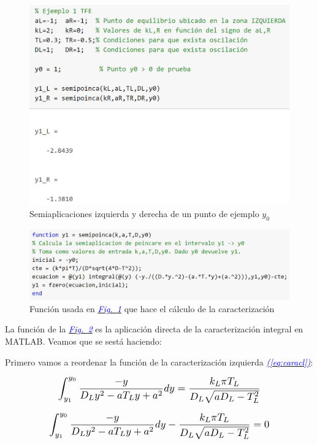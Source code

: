 \documentclass[12pt,a4paper]{report} %
\newcommand{\fref}[1]{\hyperref[#1]{\textcolor{blue}{\textit{Fig.~\ref*{#1}}}}}
\newcommand{\eref}[1]{\hyperref[#1]{\textcolor{blue}{\textit{(\ref*{#1})}}}}
\begin{document}
	\begin{figure}[h]
		\centering
		\includegraphics[width=1\textwidth]{ejem1.jpg}
		\caption{Semiaplicaciones izquierda y derecha de un punto de ejemplo $y_0$}
		\label{fig:ejem1}
	\end{figure}\smallskip
	\newpage
	
		\begin{figure}[h]
		\centering
		\includegraphics[width=1\textwidth]{ejem1_1.jpg}
		\caption{Función usada en \fref{fig:ejem1} que hace el cálculo de la caracterización}
		\label{fig:ejem1_1}
	\end{figure}\smallskip
	
	La función de la \fref{fig:ejem1_1} es la aplicación directa de la caracterización integral en MATLAB. Veamos que se sestá haciendo:
	
	\vspace{0.5cm}\noindent Primero vamos a reordenar la función de la caracterización izquierda \eref{eq:caracl}:
	
	\begin{equation}
			\label{eq:eje1}
		\scalebox{1.2}{$\displaystyle
		\begin{gathered}
			\int_{y_1}^{y_0}\frac{-y}{D_Ly^2-aT_Ly+a^2}dy=\frac{k_L\pi T_L}{D_L\sqrt{aD_L-T_L^2}} \\[2mm]
			\int_{y_1}^{y_0}\frac{-y}{D_Ly^2-aT_Ly+a^2}dy-\frac{k_L\pi T_L}{D_L\sqrt{aD_L-T_L^2}}=0
		\end{gathered}
			$}
	\end{equation}\smallskip
	
\end{document}

